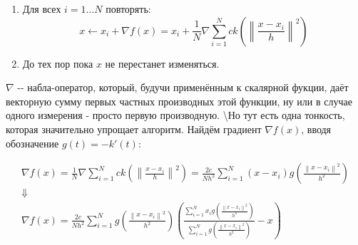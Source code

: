 \documentclass[11pt]{article}
\begin{document}
\begin{enumerate}
\item Для всех $i=1 \ldots N$ повторять:
$$
x \gets x_i + \nabla f(x) = x_i + \frac{1}{N}\nabla\sum\limits_{i = 1}^{N}ck\left(\left\|\frac{x - x_i}{h}\right\|^2\right)
$$
\item До тех пор пока $x$ не перестанет изменяться.
\end{enumerate}

$\nabla$ -\/- набла-оператор, который, будучи применённым к скалярной
фукции, даёт векторную сумму первых частных производных этой функции, ну
или в случае одного измерения - просто первую производную.
\textbackslash{}Но тут есть одна тонкость, которая значительно упрощает
алгоритм. Найдём градиент $\nabla f(x)$, вводя обозначение
$g(t) = -k'(t)$:

\begin{gather*}
\nabla f(x) = \frac{1}{N}\nabla\sum\limits_{i = 1}^{N}ck\left(\left\|\frac{x - x_i}{h}\right\|^2\right) = \frac{2c}{Nh^2}\sum\limits_{i = 1}^{N}\left(x - x_i \right)g\left(\frac{\left\|x - x_i\right\|^2}{h^2}\right) \\
\Downarrow \\
\nabla f(x) = \frac{2c}{Nh^2}\sum\limits_{i = 1}^{N}g\left(\frac{\left\|x - x_i\right\|^2}{h^2}\right)\left(\frac{\sum\limits_{i = 1}^{N}x_i g\left(\frac{\left\|x - x_i\right\|^2}{h^2}\right)}{\sum\limits_{i = 1}^{N}g\left(\frac{\left\|x - x_i\right\|^2}{h^2}\right)} - x \right)
\end{gather*}
\end{document}
